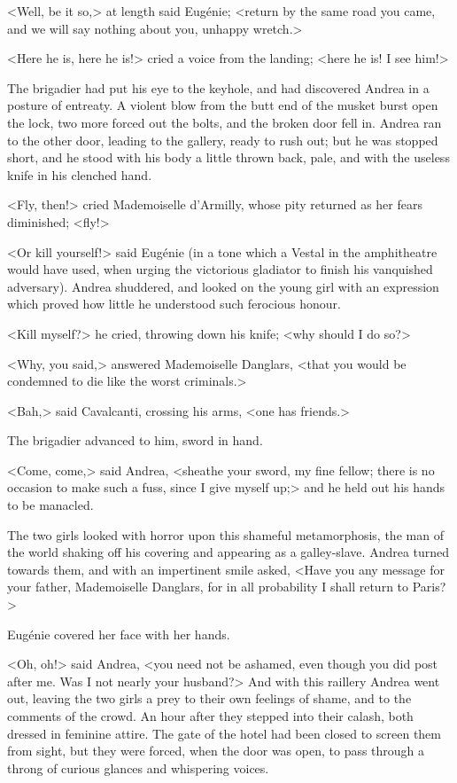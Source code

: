  <Well, be it so,> at length said Eugénie; <return by the same road you came, and we will say nothing about you, unhappy wretch.> 

 <Here he is, here he is!> cried a voice from the landing; <here he is! I see him!> 

 The brigadier had put his eye to the keyhole, and had discovered Andrea in a posture of entreaty. A violent blow from the butt end of the musket burst open the lock, two more forced out the bolts, and the broken door fell in. Andrea ran to the other door, leading to the gallery, ready to rush out; but he was stopped short, and he stood with his body a little thrown back, pale, and with the useless knife in his clenched hand. 

 <Fly, then!> cried Mademoiselle d'Armilly, whose pity returned as her fears diminished; <fly!> 

 <Or kill yourself!> said Eugénie (in a tone which a Vestal in the amphitheatre would have used, when urging the victorious gladiator to finish his vanquished adversary). Andrea shuddered, and looked on the young girl with an expression which proved how little he understood such ferocious honour. 

 <Kill myself?> he cried, throwing down his knife; <why should I do so?> 

 <Why, you said,> answered Mademoiselle Danglars, <that you would be condemned to die like the worst criminals.>

<Bah,> said Cavalcanti, crossing his arms, <one has friends.> 

 The brigadier advanced to him, sword in hand. 

 <Come, come,> said Andrea, <sheathe your sword, my fine fellow; there is no occasion to make such a fuss, since I give myself up;> and he held out his hands to be manacled. 

 The two girls looked with horror upon this shameful metamorphosis, the man of the world shaking off his covering and appearing as a galley-slave. Andrea turned towards them, and with an impertinent smile asked, <Have you any message for your father, Mademoiselle Danglars, for in all probability I shall return to Paris?> 

 Eugénie covered her face with her hands. 

 <Oh, oh!> said Andrea, <you need not be ashamed, even though you did post after me. Was I not nearly your husband?>  And with this raillery Andrea went out, leaving the two girls a prey to their own feelings of shame, and to the comments of the crowd. An hour after they stepped into their calash, both dressed in feminine attire. The gate of the hotel had been closed to screen them from sight, but they were forced, when the door was open, to pass through a throng of curious glances and whispering voices. 

